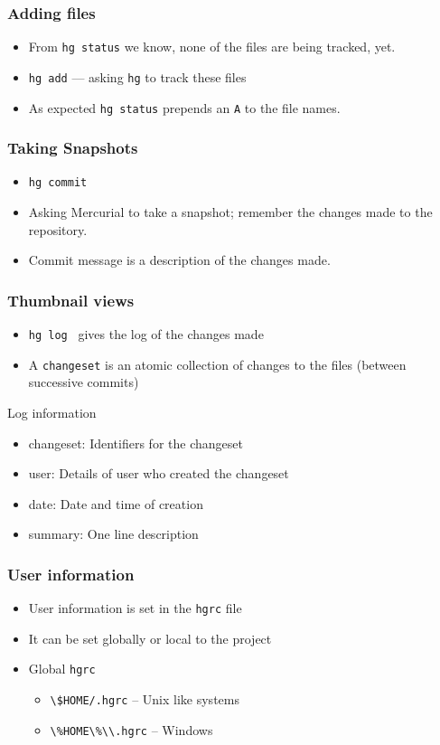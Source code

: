 \documentclass[14pt,compress]{beamer}
\newcounter{time}
\newcommand{\typ}[1]{\lstinline{#1}}
\begin{document}
\begin{frame}
  \frametitle{Adding files}
  \begin{itemize}
  \item From \typ{hg status} we know, none of the files are being
    tracked, yet. 
  \item \typ{hg add} --- asking \typ{hg} to track these files
  \item As expected \typ{hg status} prepends an \typ{A} to the file names.
  \end{itemize}
\end{frame}

\begin{frame}
  \frametitle{Taking Snapshots}
  \begin{itemize}
  \item \typ{hg commit}
  \item Asking Mercurial to take a snapshot; remember the changes made
    to the repository. 
  \item Commit message is a description of the changes made. 
  \end{itemize}
\end{frame}

\begin{frame}
  \frametitle{Thumbnail views}
  \begin{itemize}
  \item \typ{hg log}~ gives the log of the changes made
  \item A \typ{changeset} is an atomic collection of changes to the
    files (between successive commits)
  \end{itemize}
  \begin{block}{Log information}
    \begin{itemize}
    \item \alert{changeset}: Identifiers for the changeset
    \item \alert{user}: Details of user who created the changeset
    \item \alert{date}: Date and time of creation
    \item \alert{summary}: One line description
    \end{itemize}    
  \end{block}
\end{frame}

\begin{frame}
  \frametitle{User information}
  \begin{itemize}
  \item User information is set in the \typ{hgrc} file
  \item It can be set globally or local to the project
  \item Global \typ{hgrc}
    \begin{itemize}
    \item \typ{\$HOME/.hgrc} -- Unix like systems
    \item \typ{\%HOME\%\\.hgrc} -- Windows
    \end{itemize}
  \end{itemize}
\end{frame}
\end{document}
